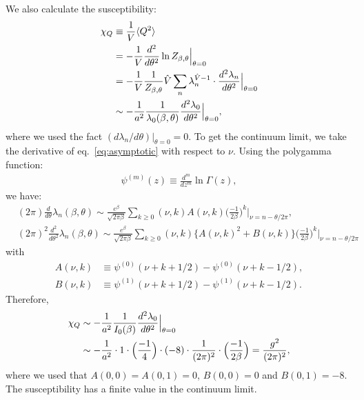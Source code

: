 \documentclass[12pt]{article}
\begin{document}
We also calculate the susceptibility:
\begin{align}
  \chi_Q
  & \equiv {1\over V} \langle Q^2 \rangle \nonumber\\
  &=
    -{ 1\over V} \frac{d^2}{d\theta^2} \ln Z_{\beta,\theta}\Big|_{\theta=0}
    \nonumber\\
  &= -{ 1\over V} \frac{1}{Z_{\beta,\theta}} \hat{V}
    \sum_n \lambda_n^{\hat{V}-1} \cdot \frac{d^2\lambda_n}{d\theta^2}\Big|_{\theta=0} \nonumber\\
  &\sim
    -{ 1\over a^2}
    {1\over\lambda_0(\beta,\theta)}
    \frac{d^2\lambda_0}{d\theta^2}
    \Big|_{\theta=0},
\end{align}
where we used the fact $(d\lambda_n/d\theta) |_{\theta=0} = 0$.
To get the continuum limit, we take
the derivative of eq.~\eqref{eq:asymptotic} with respect to $\nu$.
Using the polygamma function:
\begin{align}
  \psi^{(m)}(z) \equiv \frac{d^m}{dz^m} \ln \Gamma(z),
\end{align}
we have:
\begin{align}
  &(2\pi)\frac{d}{d\theta}\lambda_n(\beta,\theta)
    \sim
    \frac{e^\beta}{\sqrt{2\pi \beta}} \sum_{k\geq 0}
    (\nu,k) A(\nu,k)
    \Big(\frac{-1}{2\beta}\Big)^k
    \Big|_{\nu=n-\theta/2\pi}, \\
  &(2\pi)^2\frac{d^2}{d\theta^2}\lambda_n(\beta,\theta)
    \sim
    \frac{e^\beta}{\sqrt{2\pi \beta}} \sum_{k\geq 0}
    (\nu,k)
    \big\{
    A(\nu,k)^2 + B(\nu,k)
    \big\}
    \Big(\frac{-1}{2\beta}\Big)^k
    \Big|_{\nu=n-\theta/2\pi}
\end{align}
with
\begin{align}
  A(\nu, k) &\equiv \psi^{(0)}(\nu+k+1/2)-\psi^{(0)}(\nu+k-1/2), \\
  B(\nu, k) &\equiv \psi^{(1)}(\nu+k+1/2)-\psi^{(1)}(\nu+k-1/2).
\end{align}
Therefore,
\begin{align}
  \chi_Q
  &\sim
  -{ 1\over a^2}
  {1\over I_0(\beta)}
  \frac{d^2\lambda_0}{d\theta^2}
    \Big|_{\theta=0} \nonumber\\
  &\sim
    -
    {1\over a^2}
    \cdot
    1
    \cdot
    \Big({-1\over 4}\Big)\cdot (-8) \cdot
    \frac{1}{(2\pi)^2}
    \cdot
    \Big({-1\over 2\beta}
    \Big)
    =
    \frac{g^2}{(2 \pi)^2},
\end{align}
where we used that $A(0,0)=A(0,1)=0$, $B(0,0)=0$ and $B(0,1)=-8$.
The susceptibility has a finite value in the continuum limit.
\end{document}
